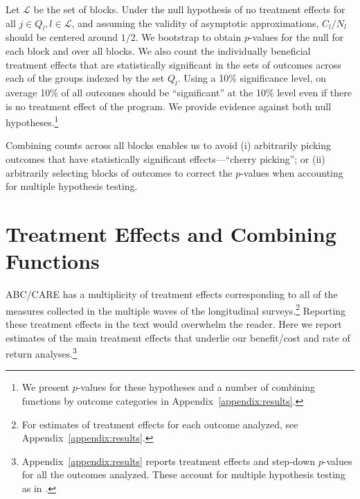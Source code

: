 Let $\mathcal{L}$ be the set of blocks. Under the null hypothesis of no treatment effects for all $j \in Q_l, l \in \mathcal{L}$, and assuming the validity of asymptotic approximations, $C_l / N_l$ should be centered around $1/2$. We bootstrap to obtain $p$-values for the null for each block and over all blocks. We also count the individually beneficial treatment effects that are statistically significant in the sets of outcomes across each of the groups indexed by the set $Q_l$. Using a 10\% significance level, on average 10\% of all outcomes should be ``significant'' at the 10\% level even if there is no treatment effect of the program. We provide evidence against both null hypotheses.\footnote{We present $p$-values for these hypotheses and a number of combining functions by outcome categories in Appendix~\ref{appendix:results}.}

Combining counts across all blocks enables us to avoid (i) arbitrarily picking outcomes that have statistically significant effects---``cherry picking''; or (ii) arbitrarily selecting blocks of outcomes to correct the $p$-values when accounting for multiple hypothesis testing.

\section{Treatment Effects and Combining Functions}\label{section:c-functions}

ABC/CARE has a multiplicity of treatment effects corresponding to all of the measures collected in the multiple waves of the longitudinal surveys.\footnote{For estimates of treatment effects for each outcome analyzed, see Appendix~\ref{appendix:results}.} Reporting these treatment effects in the text would overwhelm the reader. Here we report estimates of the main treatment effects that underlie our benefit/cost and rate of return analyses.\footnote{Appendix~\ref{appendix:results} reports treatment effects and step-down $p$-values for all the outcomes analyzed. These account for multiple hypothesis testing as in \citet{Lehman_Romano_2005_AnnStat,Romano_Shaikh_2006_AnnStat}.}


